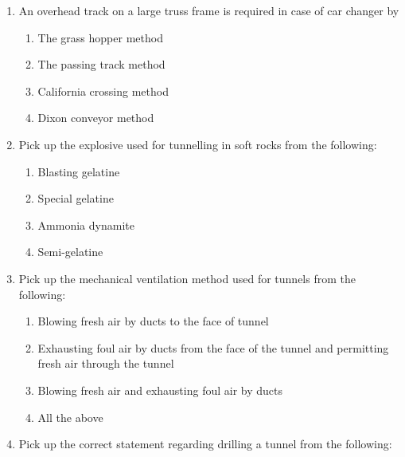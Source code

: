 \documentclass[11pt,a4paper]{article}
\begin{document}
\begin{enumerate}
{4. Mucking \\

5. Removing foul gas \\

6. Setting up and drilling \\

7. Guniting \\

Select the correct answer}
\begin{enumerate}[label=\Alph*.]
\item{1, 6, 5, 3, 4, 2, 7}
\item{1, 2, 6, 3, 5, 4, 7}
\item{1, 6, 2, 5, 4, 3, 7}
\item{1, 6, 2, 5, 3, 4, 7}
\end{enumerate}
\item{An overhead track on a large truss frame is required in case of car changer by}
\begin{enumerate}[label=\Alph*.]
\item{The grass hopper method}
\item{The passing track method}
\item{California crossing method}
\item{Dixon conveyor method}
\end{enumerate}
\item{Pick up the explosive used for tunnelling in soft rocks from the following:}
\begin{enumerate}[label=\Alph*.]
\item{Blasting gelatine}
\item{Special gelatine}
\item{Ammonia dynamite}
\item{Semi-gelatine}
\end{enumerate}
\item{Pick up the mechanical ventilation method used for tunnels from the following:}
\begin{enumerate}[label=\Alph*.]
\item{Blowing fresh air by ducts to the face of tunnel}
\item{Exhausting foul air by ducts from the face of the tunnel and permitting fresh air through the tunnel}
\item{Blowing fresh air and exhausting foul air by ducts}
\item{All the above}
\end{enumerate}
\item{Pick up the correct statement regarding drilling a tunnel from the following:}

\end{enumerate}
\end{document}
